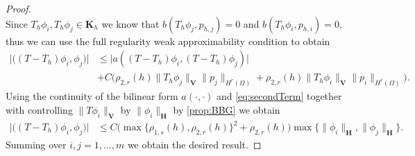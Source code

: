\documentclass[USenglish]{article}
\theoremstyle{dgthm}
\theoremstyle{dgdef}
\let\vec\bm
\newcommand\norm[1]{\lVert#1\rVert}
\newcommand\abs[1]{\lvert#1\rvert}
\begin{document}
\begin{proof}
\begin{equation}
  \end{equation}
  Since $T_h\phi_i, T_h\phi_j\in \vec{K}_h$ we know that $b(T_h\phi_j,p_{h,j})=0$ and $b(T_h\phi_i,p_{h,i})=0$, thus we can use the full regularity weak approximability condition to obtain
  \begin{align}
    \abs{\Big((T-T_h)\phi_i,\phi_j\Big)} & \leq \abs{a((T-T_h)\phi_i,(T-T_h)\phi_j)} \\
    &+ C\Big(\rho_{2,r}(h)\norm{T_h\phi_j}_{\vec{V}}\norm{p_j}_{H^r(\Omega)} + \rho_{2,r}(h)\norm{T_h\phi_i}_{\vec{V}}\norm{p_i}_{H^r(\Omega)}\Big).
  \end{align}
  Using the continuity of the bilinear form $a(\cdot,\cdot)$ and \eqref{eq:secondTerm} together with controlling $\norm{T\phi_i}_{\vec{V}}$ by $\norm{\phi_i}_{\vec{H}}$ by \cref{prop:BBG} we obtain
  \begin{align}
    \abs{\Big((T-T_h)\phi_i,\phi_j\Big)} & \leq C \Big(\max\{\rho_{1,s}(h),\rho_{2,r}(h)\}^2 + \rho_{2,r}(h)\Big)\max\{\norm{\phi_i}_{\vec{H}},\norm{\phi_j}_{\vec{H}}\}.
  \end{align}
  Summing over $i,j=1,\ldots,m$ we obtain the desired result.
\end{proof}
\end{document}
